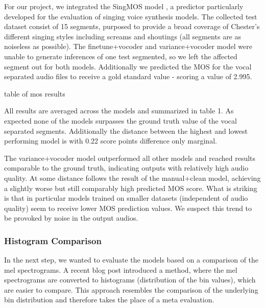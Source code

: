 \documentclass[a4paper]{article}
\begin{document}
	For our project, we integrated the SingMOS model \cite{Tang2024}, a predictor particularly developed for the evaluation of singing voice synthesis models. The collected test dataset consist of 15 segments, purposed to provide a broad coverage of Chester’s different singing styles including screams and shoutings (all segments are as noiseless as possible). The finetune+vocoder and variance+vocoder model were unable to generate inferences of one test segmented, so we left the affected segment out for both models. Additionally we predicted the MOS for the vocal separated audio files to receive a gold standard value - scoring a value of 2.995.
	
	\color{red}table of mos results\color{black}
	
	All results are averaged across the models and summarized in \color{red}table 1\color{black}. As expected none of the models surpasses the ground truth value of the vocal separated segments. Additionally the distance between the highest and lowest performing model is with 0.22 score points difference only marginal. 
	
	The variance+vocoder model outperformed all other models and reached results comparable to the ground truth, indicating outputs with relatively high audio quality. At some distance follows the result of the manual+clean model, achieving a slightly worse but still comparably high predicted MOS score. What is striking is that in particular models trained on smaller datasets (independent of audio quality) seem to receive lower MOS prediction values. We suspect this trend to be provoked by noise in the output audios.
	
	\subsubsection{Histogram Comparison}
	
	In the next step, we wanted to evaluate the models based on a comparison of the mel spectrograms. A recent blog post introduced a method, where the mel spectrograms are converted to histograms (distribution of the bin values), which are easier to compare. \cite{mel-spectrogram} This approach resembles the comparison of the underlying bin distribution and therefore takes the place of a meta evaluation. 
	
\end{document}
